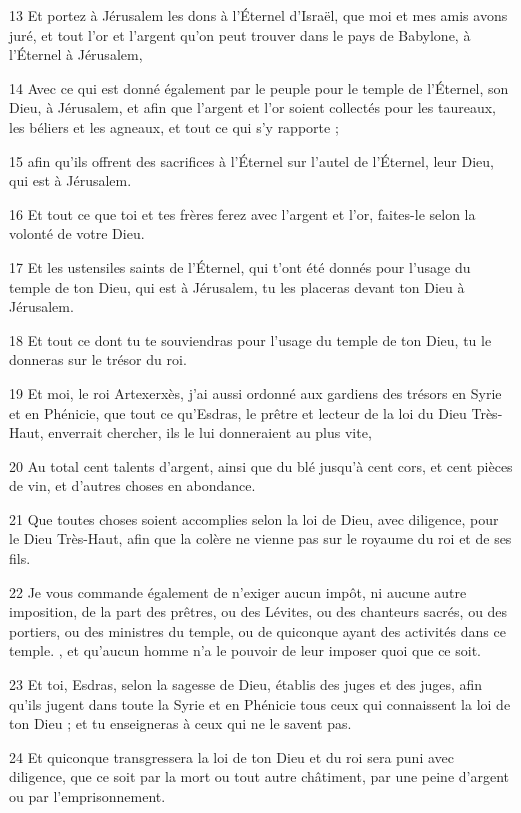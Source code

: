 \par 13 Et portez à Jérusalem les dons à l'Éternel d'Israël, que moi et mes amis avons juré, et tout l'or et l'argent qu'on peut trouver dans le pays de Babylone, à l'Éternel à Jérusalem,
\par 14 Avec ce qui est donné également par le peuple pour le temple de l'Éternel, son Dieu, à Jérusalem, et afin que l'argent et l'or soient collectés pour les taureaux, les béliers et les agneaux, et tout ce qui s'y rapporte ;
\par 15 afin qu'ils offrent des sacrifices à l'Éternel sur l'autel de l'Éternel, leur Dieu, qui est à Jérusalem.
\par 16 Et tout ce que toi et tes frères ferez avec l'argent et l'or, faites-le selon la volonté de votre Dieu.
\par 17 Et les ustensiles saints de l'Éternel, qui t'ont été donnés pour l'usage du temple de ton Dieu, qui est à Jérusalem, tu les placeras devant ton Dieu à Jérusalem.
\par 18 Et tout ce dont tu te souviendras pour l'usage du temple de ton Dieu, tu le donneras sur le trésor du roi.
\par 19 Et moi, le roi Artexerxès, j'ai aussi ordonné aux gardiens des trésors en Syrie et en Phénicie, que tout ce qu'Esdras, le prêtre et lecteur de la loi du Dieu Très-Haut, enverrait chercher, ils le lui donneraient au plus vite,
\par 20 Au total cent talents d'argent, ainsi que du blé jusqu'à cent cors, et cent pièces de vin, et d'autres choses en abondance.
\par 21 Que toutes choses soient accomplies selon la loi de Dieu, avec diligence, pour le Dieu Très-Haut, afin que la colère ne vienne pas sur le royaume du roi et de ses fils.
\par 22 Je vous commande également de n'exiger aucun impôt, ni aucune autre imposition, de la part des prêtres, ou des Lévites, ou des chanteurs sacrés, ou des portiers, ou des ministres du temple, ou de quiconque ayant des activités dans ce temple. , et qu'aucun homme n'a le pouvoir de leur imposer quoi que ce soit.
\par 23 Et toi, Esdras, selon la sagesse de Dieu, établis des juges et des juges, afin qu'ils jugent dans toute la Syrie et en Phénicie tous ceux qui connaissent la loi de ton Dieu ; et tu enseigneras à ceux qui ne le savent pas.
\par 24 Et quiconque transgressera la loi de ton Dieu et du roi sera puni avec diligence, que ce soit par la mort ou tout autre châtiment, par une peine d'argent ou par l'emprisonnement.
